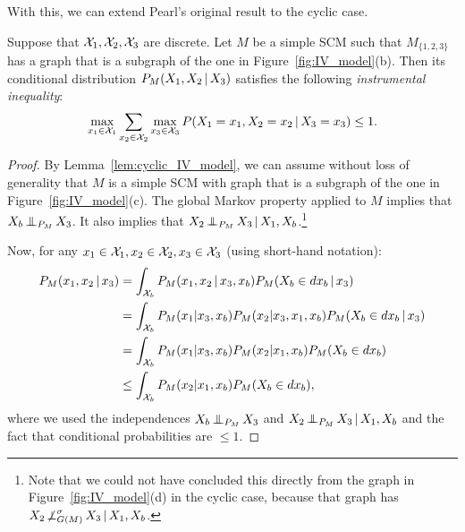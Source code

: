 With this, we can extend Pearl's original result to the cyclic case.
\begin{Prp}\label{prp:instrumental_inequality}
  Suppose that $\mathcal{X}_1, \mathcal{X}_2, \mathcal{X}_3$ are discrete. 
  Let $M$ be a simple SCM such that $M_{\{1,2,3\}}$ has a graph that is a subgraph of the one in Figure~\ref{fig:IV_model}(b). 
  Then its conditional distribution $P_M(X_1,X_2 \operatorname*{|} X_3)$ satisfies the following \emph{instrumental inequality}:
  \begin{equation}\label{eq:instrumental_inequality}
  \max_{x_1\in\mathcal{X}_1} \sum_{x_2\in\mathcal{X}_2} \max_{x_3\in\mathcal{X}_3} P(X_1=x_1,X_2=x_2 \operatorname*{|} X_3=x_3) \le 1.
  \end{equation}
\end{Prp}
\begin{proof}
  By Lemma~\ref{lem:cyclic_IV_model}, we can assume without loss of generality that $M$ is a simple SCM with graph that is a subgraph of the one in Figure~\ref{fig:IV_model}(c).
  The global Markov property applied to $M$ implies that $X_b \operatorname*{\perp\mkern-11mu\perp}_{P_M} X_3$.
  It also implies that $X_2 \operatorname*{\perp\mkern-11mu\perp}_{P_M} X_3 \operatorname*{|} X_1, X_b$.\footnote{Note that we could not have concluded this directly from the graph in Figure~\ref{fig:IV_model}(d) in the cyclic case, because that graph has $X_2 \operatorname*{\not\perp}^{\sigma}_{G(M)} X_3 \operatorname*{|} X_1, X_b$. }

  Now, for any $x_1 \in \mathcal{X}_1, x_2 \in \mathcal{X}_2, x_3 \in \mathcal{X}_3$ (using short-hand notation):
  \begin{align*}
    P_M(x_1,x_2 \operatorname*{|} x_3) 
    &= \int_{\mathcal{X}_b} P_M(x_1,x_2 \operatorname*{|} x_3,x_b) P_M(X_b \in dx_b \operatorname*{|} x_3) \\
    &= \int_{\mathcal{X}_b} P_M(x_1|x_3,x_b) P_M(x_2|x_3,x_1,x_b) P_M(X_b \in dx_b \operatorname*{|} x_3) \\
    &= \int_{\mathcal{X}_b} P_M(x_1|x_3,x_b) P_M(x_2|x_1,x_b) P_M(X_b \in dx_b) \\
    &\le \int_{\mathcal{X}_b} P_M(x_2|x_1,x_b) P_M(X_b \in dx_b),
  \end{align*}
  where we used the independences $X_b \operatorname*{\perp\mkern-11mu\perp}_{P_M} X_3$ and $X_2 \operatorname*{\perp\mkern-11mu\perp}_{P_M} X_3 \operatorname*{|} X_1, X_b$ and the fact that conditional probabilities are $\le 1$.


\end{proof}
